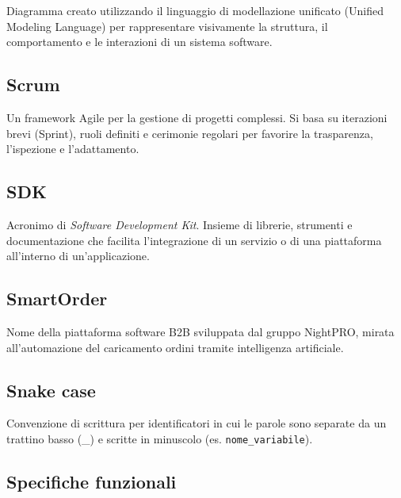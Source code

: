 \documentclass[a4paper, 11pt, oneside]{scrartcl} %
\begin{document}
Diagramma creato utilizzando il linguaggio di modellazione unificato (Unified Modeling Language) per rappresentare visivamente la struttura, il comportamento e le interazioni di un sistema software.

\vspace{0.5cm}

\subsection*{Scrum}
Un framework Agile per la gestione di progetti complessi. Si basa su iterazioni brevi (Sprint), ruoli definiti e cerimonie regolari per favorire la trasparenza, l'ispezione e l'adattamento.
\vspace{0.5cm}

\subsection*{SDK}
Acronimo di \textit{Software Development Kit}. Insieme di librerie, strumenti e documentazione che facilita l'integrazione di un servizio o di una piattaforma all'interno di un'applicazione.
\vspace{0.5cm}

\subsection*{SmartOrder}
Nome della piattaforma software B2B sviluppata dal gruppo NightPRO, mirata all'automazione del caricamento ordini tramite intelligenza artificiale.
\vspace{0.5cm}

\subsection*{Snake case}
Convenzione di scrittura per identificatori in cui le parole sono separate da un trattino basso (\_) e scritte in minuscolo (es. \texttt{nome\_variabile}).
\vspace{0.5cm}

\subsection*{Specifiche funzionali}

\end{document}
